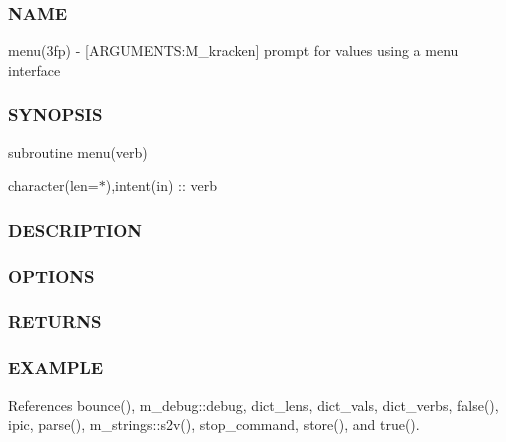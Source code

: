 \subsubsection*{N\+A\+ME}

menu(3fp) -\/ \mbox{[}A\+R\+G\+U\+M\+E\+N\+TS\+:M\+\_\+kracken\mbox{]} prompt for values using a menu interface \subsubsection*{S\+Y\+N\+O\+P\+S\+IS}

subroutine menu(verb)

character(len=$\ast$),intent(in) \+:\+: verb \subsubsection*{D\+E\+S\+C\+R\+I\+P\+T\+I\+ON}

\subsubsection*{O\+P\+T\+I\+O\+NS}

\subsubsection*{R\+E\+T\+U\+R\+NS}

\subsubsection*{E\+X\+A\+M\+P\+LE}

References bounce(), m\+\_\+debug\+::debug, dict\+\_\+lens, dict\+\_\+vals, dict\+\_\+verbs, false(), ipic, parse(), m\+\_\+strings\+::s2v(), stop\+\_\+command, store(), and true().

\mbox{\label{namespacem__kracken_a495ed7db5c2d301c4d5e623b62a9c295}} 
